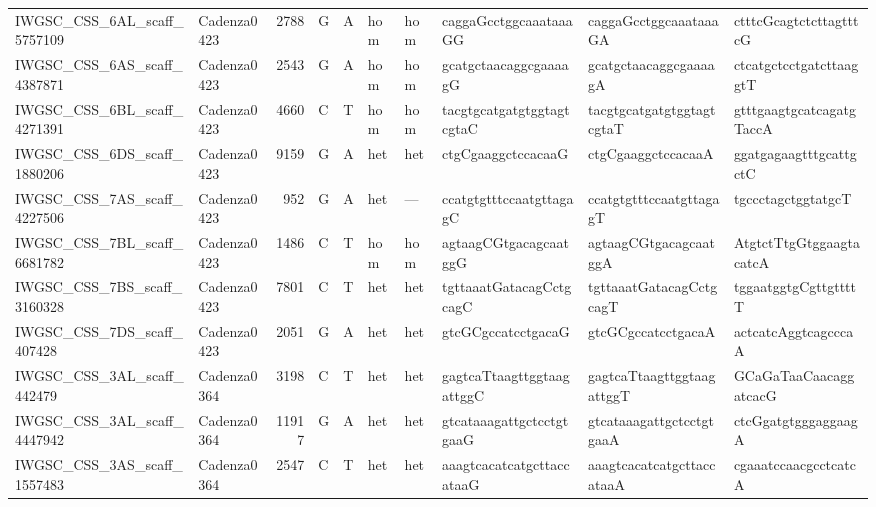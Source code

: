 \begin{longtable}{llrlllllll}
 IWGSC\_CSS\_6AL\_scaff\_5757109  & Cadenza0423 &       2788 & G         & A        & hom            & hom         & caggaGcctggcaaataaaGG     & caggaGcctggcaaataaaGA     & ctttcGcagtctcttagtttcG    \\
 IWGSC\_CSS\_6AS\_scaff\_4387871  & Cadenza0423 &       2543 & G         & A        & hom            & hom         & gcatgctaacaggcgaaaagG     & gcatgctaacaggcgaaaagA     & ctcatgctcctgatcttaaggtT   \\
 IWGSC\_CSS\_6BL\_scaff\_4271391  & Cadenza0423 &       4660 & C         & T        & hom            & hom         & tacgtgcatgatgtggtagtcgtaC & tacgtgcatgatgtggtagtcgtaT & gtttgaagtgcatcagatgTaccA  \\
 IWGSC\_CSS\_6DS\_scaff\_1880206  & Cadenza0423 &       9159 & G         & A        & het            & het         & ctgCgaaggctccacaaG        & ctgCgaaggctccacaaA        & ggatgagaagtttgcattgctC    \\
 IWGSC\_CSS\_7AS\_scaff\_4227506  & Cadenza0423 &        952 & G         & A        & het            & ---         & ccatgtgtttccaatgttagagC   & ccatgtgtttccaatgttagagT   & tgccctagctggtatgcT        \\
 IWGSC\_CSS\_7BL\_scaff\_6681782  & Cadenza0423 &       1486 & C         & T        & hom            & hom         & agtaagCGtgacagcaatggG     & agtaagCGtgacagcaatggA     & AtgtctTtgGtggaagtacatcA   \\
 IWGSC\_CSS\_7BS\_scaff\_3160328  & Cadenza0423 &       7801 & C         & T        & het            & het         & tgttaaatGatacagCctgcagC   & tgttaaatGatacagCctgcagT   & tggaatggtgCgttgttttT      \\
 IWGSC\_CSS\_7DS\_scaff\_407428   & Cadenza0423 &       2051 & G         & A        & het            & het         & gtcGCgccatcctgacaG        & gtcGCgccatcctgacaA        & actcatcAggtcagcccaA       \\
 IWGSC\_CSS\_3AL\_scaff\_442479   & Cadenza0364 &       3198 & C         & T        & het            & het         & gagtcaTtaagttggtaagattggC & gagtcaTtaagttggtaagattggT & GCaGaTaaCaacaggatcacG     \\
 IWGSC\_CSS\_3AL\_scaff\_4447942  & Cadenza0364 &      11917 & G         & A        & het            & het         & gtcataaagattgctcctgtgaaG  & gtcataaagattgctcctgtgaaA  & ctcGgatgtgggaggaagA       \\
 IWGSC\_CSS\_3AS\_scaff\_1557483  & Cadenza0364 &       2547 & C         & T        & het            & het         & aaagtcacatcatgcttaccataaG & aaagtcacatcatgcttaccataaA & cgaaatccaacgcctcatcA      \\

\end{longtable}

